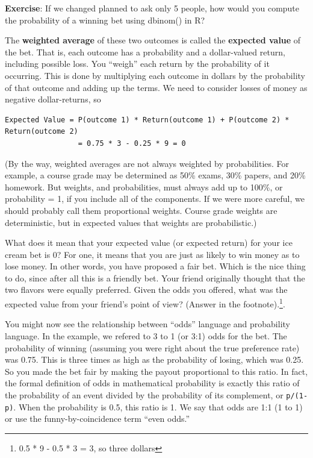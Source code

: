\documentclass[openany]{book}
\begin{document}
\textbf{Exercise}: If we changed planned to ask only 5 people, how would you compute the probability of a winning bet using dbinom() in R?

The \textbf{weighted average} of these two outcomes is called the \textbf{expected value} of the bet. That is, each outcome has a probability and a dollar-valued return, including possible loss. You ``weigh'' each return by the probability of it occurring. This is done by multiplying each outcome in dollars by the probability of that outcome and adding up the terms. We need to consider losses of money as negative dollar-returns, so

\begin{verbatim}
Expected Value = P(outcome 1) * Return(outcome 1) + P(outcome 2) * Return(outcome 2)
                 = 0.75 * 3 - 0.25 * 9 = 0
\end{verbatim}

(By the way, weighted averages are not always weighted by probabilities. For example, a course grade may be determined as 50\% exams, 30\% papers, and 20\% homework. But weights, and probabilities, must always add up to 100\%, or probability = 1, if you include all of the components. If we were more careful, we should probably call them proportional weights. Course grade weights are deterministic, but in expected values that weights are probabilistic.)

What does it mean that your expected value (or expected return) for your ice cream bet is 0? For one, it means that you are just as likely to win money as to lose money. In other words, you have proposed a fair bet. Which is the nice thing to do, since after all this is a friendly bet. Your friend originally thought that the two flavors were equally preferred. Given the odds you offered, what was the expected value from your friend's point of view? (Answer in the footnote).\footnote{0.5 * 9 - 0.5 * 3 = 3, so three dollars}.

You might now see the relationship between ``odds'' language and probability language. In the example, we refered to 3 to 1 (or 3:1) odds for the bet. The probability of winning (assuming you were right about the true preference rate) was 0.75. This is three times as high as the probability of losing, which was 0.25. So you made the bet fair by making the payout proportional to this ratio. In fact, the formal definition of odds in mathematical probability is exactly this ratio of the probability of an event divided by the probability of its complement, or \texttt{p/(1-p)}. When the probability is 0.5, this ratio is 1. We say that odds are 1:1 (1 to 1) or use the funny-by-coincidence term ``even odds.''
\end{document}
